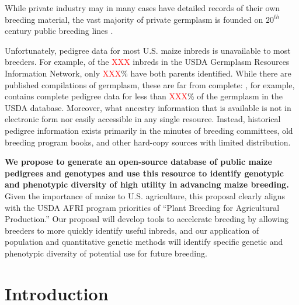 \documentclass[12pt]{article}
\begin{document}
While private industry may in many cases have detailed records of their own breeding material, the vast majority of private germplasm is founded on $20^{th}$ century public breeding lines \citep{nelson2008molecular}.

Unfortunately, pedigree data for most U.S. maize inbreds is unavailable to most breeders. 
For example, of the \textcolor{red}{XXX} inbreds in the USDA Germplasm Resources Information Network, only \textcolor{red}{XXX}\% have both parents identified. 
While there are published compilations of germplasm, these are far from complete:  \citet{gerdes1993compilation}, for example, contains complete pedigree data for less than \textcolor{red}{XXX}\% of the germplasm in the USDA database.
Moreover, what ancestry information that is available is not in electronic form nor easily accessible in any single resource.  
Instead, historical pedigree information exists primarily in the minutes of breeding committees, old breeding program books, and other hard-copy sources with limited distribution.  

{\bf We propose to  generate an open-source database of public maize pedigrees and genotypes and use this resource to identify genotypic and phenotypic diversity of high utility in advancing maize breeding.}
Given the importance of maize to U.S. agriculture, this proposal clearly aligns with the USDA AFRI program priorities of ``Plant Breeding for Agricultural Production.''  
Our proposal will develop tools to accelerate breeding by allowing breeders to more quickly identify useful inbreds, and our application of population and quantitative genetic methods will identify specific genetic and phenotypic diversity of potential use for future breeding.  

\section*{Introduction}
\label{sec:introduction}

\end{document}
